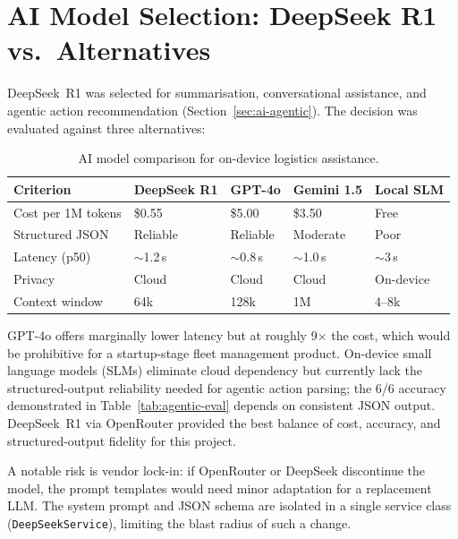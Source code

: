 \section{AI Model Selection: DeepSeek R1 vs.\ Alternatives}
\label{sec:disc-ai}

DeepSeek~R1 was selected for summarisation, conversational assistance, and
agentic action recommendation (Section~\ref{sec:ai-agentic}).  The decision
was evaluated against three alternatives:

\begin{table}[H]
  \centering
  \caption{AI model comparison for on-device logistics assistance.}
  \label{tab:ai-comparison}
  \small
  \begin{tabularx}{\textwidth}{l X X X X}
    \toprule
    \textbf{Criterion} & \textbf{DeepSeek R1} & \textbf{GPT-4o} &
    \textbf{Gemini 1.5} & \textbf{Local SLM} \\
    \midrule
    Cost per 1M tokens & \$0.55 & \$5.00 & \$3.50 & Free \\
    Structured JSON     & Reliable & Reliable & Moderate & Poor \\
    Latency (p50)       & $\sim$1.2\,s & $\sim$0.8\,s & $\sim$1.0\,s &
                          $\sim$3\,s \\
    Privacy             & Cloud & Cloud & Cloud & On-device \\
    Context window      & 64k & 128k & 1M & 4--8k \\
    \bottomrule
  \end{tabularx}
\end{table}

GPT-4o offers marginally lower latency but at roughly 9$\times$ the cost,
which would be prohibitive for a startup-stage fleet management product.
On-device small language models (SLMs) eliminate cloud dependency but
currently lack the structured-output reliability needed for agentic action
parsing; the 6/6 accuracy demonstrated in Table~\ref{tab:agentic-eval}
depends on consistent JSON output.  DeepSeek~R1 via OpenRouter provided the
best balance of cost, accuracy, and structured-output fidelity for this
project.

A notable risk is vendor lock-in: if OpenRouter or DeepSeek discontinue the
model, the prompt templates would need minor adaptation for a replacement LLM.
The system prompt and JSON schema are isolated in a single service class
(\texttt{DeepSeekService}), limiting the blast radius of such a change.

